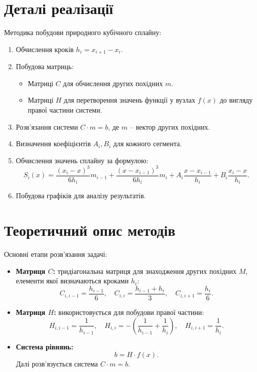 \documentclass[a4paper, 12pt]{article}
\begin{document}
\section{Деталі реалізації}

Методика побудови природного кубічного сплайну:
\begin{enumerate}
    \item Обчислення кроків \( h_i = x_{i+1} - x_i \).
    \item Побудова матриць:
    \begin{itemize}
        \item Матриці \(C\) для обчислення других похідних \(m\).
        \item Матриці \(H\) для перетворення значень функції у вузлах \(f(x)\) до вигляду правої частини системи.
    \end{itemize}
    \item Розв’язання системи \(C \cdot m = b\), де \(m\) -- вектор других похідних.
    \item Визначення коефіцієнтів \(A_i, B_i\) для кожного сегмента.
    \item Обчислення значень сплайну за формулою:
    \[
    S_i(x) = \frac{(x_i - x)^3}{6h_i}m_{i-1} + \frac{(x - x_{i-1})^3}{6h_i}m_i + A_i \frac{x - x_{i-1}}{h_i} + B_i \frac{x_i - x}{h_i}.
    \]
    \item Побудова графіків для аналізу результатів.
\end{enumerate}

\clearpage
\section{Теоретичний опис методів}

Основні етапи розв’язання задачі:
\begin{itemize}
    \item \textbf{Матриця \(C\):} тридіагональна матриця для знаходження других похідних \(M\), елементи якої визначаються кроками \(h_i\):
    \[
    C_{i, i-1} = \frac{h_{i-1}}{6}, \quad C_{i, i} = \frac{h_{i-1} + h_i}{3}, \quad C_{i, i+1} = \frac{h_i}{6}.
    \]
    \item \textbf{Матриця \(H\):} використовується для побудови правої частини:
    \[
    H_{i, i-1} = \frac{1}{h_{i-1}}, \quad H_{i, i} = -\left(\frac{1}{h_{i-1}} + \frac{1}{h_i}\right), \quad H_{i, i+1} = \frac{1}{h_i}.
    \]
    \item \textbf{Система рівнянь:}
    \[
    b = H \cdot f(x).
    \]
    Далі розв’язується система \(C \cdot m = b\).
\end{itemize}
\end{document}
